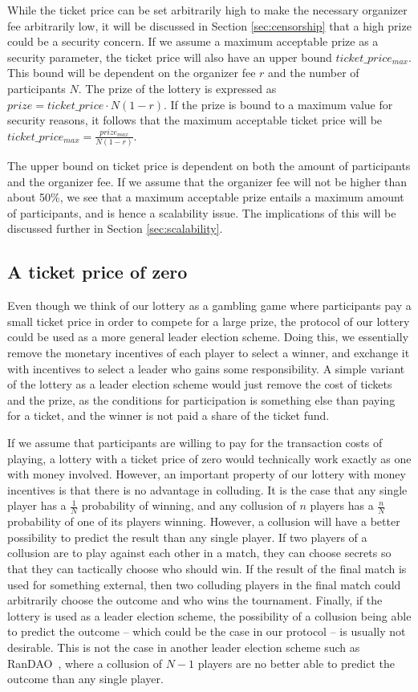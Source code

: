 While the ticket price can be set arbitrarily high to make the necessary organizer fee arbitrarily low, it will be discussed in Section \ref{sec:censorship} that a high prize could be a security concern. If we assume a maximum acceptable prize as a security parameter, the ticket price will also have an upper bound $ticket\_price_{max}$. This bound will be dependent on the organizer fee $r$ and the number of participants $N$. The prize of the lottery is expressed as $prize=ticket\_price \cdot N(1-r)$. If the prize is bound to a maximum value for security reasons, it follows that the maximum acceptable ticket price will be $ticket\_price_{max}=\frac{prize_{max}}{N(1-r)}$. 

The upper bound on ticket price is dependent on both the amount of participants and the organizer fee. If we assume that the organizer fee will not be higher than about 50\%, we see that a maximum acceptable prize entails a maximum amount of participants, and is hence a scalability issue. The implications of this will be discussed further in Section \ref{sec:scalability}.

\subsection{A ticket price of zero}
Even though we think of our lottery as a gambling game where participants pay a small ticket price in order to compete for a large prize, the protocol of our lottery could be used as a more general leader election scheme. Doing this, we essentially remove the monetary incentives of each player to select a winner, and exchange it with incentives to select a leader who gains some responsibility. A simple variant of the lottery as a leader election scheme would just remove the cost of tickets and the prize, as the conditions for participation is something else than paying for a ticket, and the winner is not paid a share of the ticket fund.

If we assume that participants are willing to pay for the transaction costs of playing, a lottery with a ticket price of zero would technically work exactly as one with money involved. However, an important property of our lottery with money incentives is that there is no advantage in colluding. It is the case that any single player has a $\frac{1}{N}$ probability of winning, and any collusion of $n$ players has a $\frac{n}{N}$ probability of one of its players winning. However, a collusion will have a better possibility to predict the result than any single player. If two players of a collusion are to play against each other in a match, they can choose secrets so that they can tactically choose who should win. If the result of the final match is used for something external, then two colluding players in the final match could arbitrarily choose the outcome and who wins the tournament. Finally, if the lottery is used as a leader election scheme, the possibility of a collusion being able to predict the outcome – which could be the case in our protocol – is usually not desirable. This is not the case in another leader election scheme such as RanDAO~\cite{randao2015randao}, where a collusion of $N-1$ players are no better able to predict the outcome than any single player.


